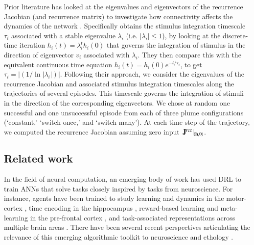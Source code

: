 \documentclass[5p,twocolumn,authoryear]{elsarticle}
\begin{document}
Prior literature has looked at the eigenvalues and eigenvectors of the recurrence Jacobian (and recurrence matrix) to investigate how connectivity affects the dynamics of the network \citep{rajan2006eigenvalue,maheswaranathan2019reverse}.  
Specifically \citep{maheswaranathan2019reverse} obtains the stimulus integration timescale $\tau_i$ associated with a stable eigenvalue $\lambda_i$ (i.e. $|\lambda_i| \leq 1$), by looking at the discrete-time iteration \mbox{$h_i(t)=\lambda_i^{t} h_i(0)$} that governs the integration of stimulus in the direction of eigenvector $v_i$ associated with $\lambda_i$.
They then compare this with the equivalent continuous time equation 
\mbox{$h_i(t)=h_i(0) e^{-t / \tau_i}$}, to get 
\mbox{$\tau_i = \left| ( 1/ \ln|\lambda_i| ) \right|$}.
Following their approach, we consider the eigenvalues of the recurrence Jacobian and associated stimulus integration timescales along the trajectories of several episodes.
This timescale governs the integration of stimuli in the direction of the corresponding eigenvectors.
We chose at random one successful and one unsuccessful episode from each of three plume configurations (`constant,' `switch-once,' and `switch-many').
At each time step of the trajectory, we computed the recurrence Jacobian assuming zero input $\left.\mathbf{J}^{\mathrm{rec}}\right|_{(\mathbf{h},0)}$.



\subsection*{Related work}
In the field of neural computation, an emerging body of work has used DRL to train ANNs that solve tasks closely inspired by tasks from neuroscience.
For instance, agents have been trained to study learning and dynamics in the motor-cortex \citep{weinstein2017structure, song2020deep}, time encoding in the hippocampus \citep{lin2021time}, reward-based learning and meta-learning in the pre-frontal cortex \citep{song2017reward, wang2018prefrontal, botvinick2019reinforcement}, and task-associated representations across multiple brain areas \citep{cross2021using}.
There have been several recent perspectives articulating the relevance of this emerging algorithmic toolkit to neuroscience \citep{botvinick2020deep,gershman2020neurobiology} and ethology \citep{crosby2020building}.
\end{document}
